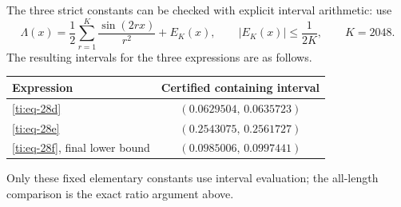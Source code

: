 \documentclass[11pt]{article}
\numberwithin{equation}{section}
\theoremstyle{definition}\newtheorem{definition}[theorem]{Definition}
\theoremstyle{remark}\newtheorem{remark}[theorem]{Remark}
\begin{document}
The three strict constants can be checked with explicit interval arithmetic: use
\begin{equation}\label{ti:eq-28g}
\Lambda(x)=\frac12\sum_{r=1}^{K}\frac{\sin(2rx)}{r^2}
+E_K(x),\qquad |E_K(x)|\le\frac1{2K},\qquad K=2048.
\end{equation}
The resulting intervals for the three expressions are as follows.
\begin{center}
\begin{tabular}{@{}lc@{}}
\toprule
Expression & Certified containing interval\\
\midrule
\eqref{ti:eq-28d} & \((0.0629504,\,0.0635723)\)\\
\eqref{ti:eq-28e} & \((0.2543075,\,0.2561727)\)\\
\eqref{ti:eq-28f}, final lower bound & \((0.0985006,\,0.0997441)\)\\
\bottomrule
\end{tabular}
\end{center}
Only these fixed elementary constants use interval evaluation;
the all-length comparison is the exact ratio argument above.
\end{document}
